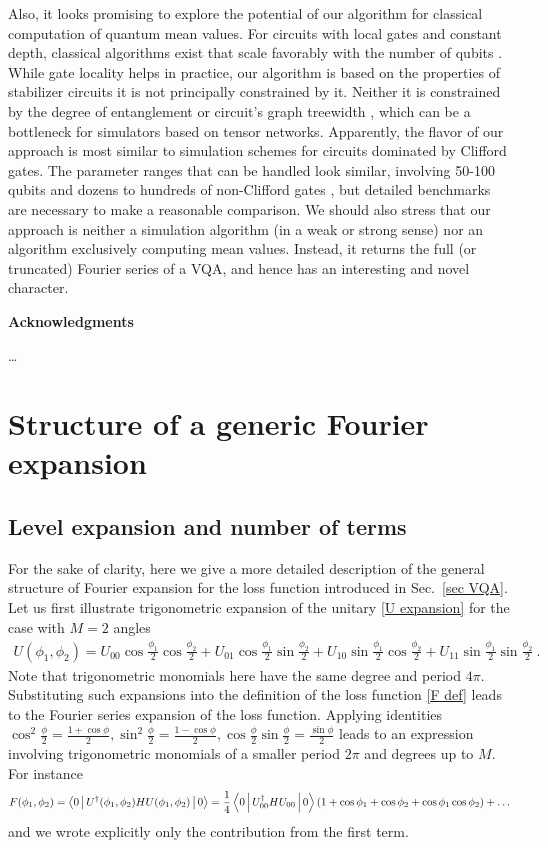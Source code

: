\documentclass[twocolumn, amsfonts, amssymb, aps, nofootinbib]{revtex4-2}
\begin{document}
Also, it looks promising to explore the potential of our algorithm for classical computation of quantum mean values. For circuits with local gates and constant depth, classical algorithms exist that scale favorably with the number of qubits \cite{Bravyi2021}. While gate locality helps in practice, our algorithm is based on the properties of stabilizer circuits it is not principally constrained by it. Neither it is constrained by the degree of entanglement \cite{Vidal2003, Zhou2020b} or circuit's graph treewidth \cite{Markov2005}, which can be a bottleneck for simulators based on tensor networks. Apparently, the flavor of our approach is most similar to simulation schemes for circuits dominated by Clifford gates. The parameter ranges that can be handled look similar, involving 50-100 qubits and dozens to hundreds of non-Clifford gates \cite{Bravyi2016, Bravyi2019}, but detailed benchmarks are necessary to make a reasonable comparison. We should also stress that our approach is neither a simulation algorithm (in a weak or strong sense) nor an algorithm exclusively computing mean values. Instead, it returns the full (or truncated) Fourier series of a VQA, and hence has an interesting and novel character.

\textbf{Acknowledgments}

\dots
\onecolumngrid


\appendix
\section{Structure of a generic Fourier expansion} \label{app explicit}
\subsection{Level expansion and number of terms}
For the sake of clarity, here we give a more detailed description of the general structure of Fourier expansion for the loss function introduced in Sec.~\ref{sec VQA}. Let us first illustrate trigonometric expansion of the unitary \eqref{U expansion} for the case with $M=2$ angles
\begin{align}
	U(\phi_1,\phi_2) = U_{00}\cos\frac{\phi_1}{2}\cos\frac{\phi_2}{2}+U_{01}\cos\frac{\phi_1}{2}\sin\frac{\phi_2}{2}+U_{10}\sin\frac{\phi_1}{2}\cos\frac{\phi_2}{2}+U_{11}\sin\frac{\phi_1}{2}\sin\frac{\phi_2}{2} \ . \label{U2}
\end{align}
Note that trigonometric monomials here have the same degree and period $4\pi$. Substituting such expansions into the definition of the loss function \eqref{F def} leads to the Fourier series expansion of the loss function. Applying identities $\cos^2\frac{\phi}{2}=\frac{1+\cos\phi}{2}, \sin^2\frac{\phi}{2}=\frac{1-\cos\phi}{2}, \cos\frac{\phi}{2}\sin\frac{\phi}{2}=\frac{\sin\phi}{2}$ leads to an expression involving trigonometric monomials of a smaller period $2\pi$ and degrees up to $M$. For instance 
\begin{align}
	F(\phi_1,\phi_2)=\Braket{0|U^\dagger(\phi_1,\phi_2)HU(\phi_1,\phi_2)|0}=\frac14\Braket{0|U_{00}^\dagger HU_{00}|0}\left(1+\cos\phi_1+\cos\phi_2+\cos\phi_1\cos\phi_2\right)+\dots
\end{align}
and we wrote explicitly only the contribution from the first term.
\end{document}
